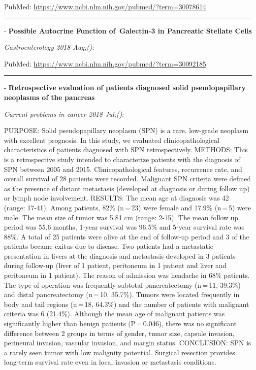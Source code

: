 \documentclass[]{article}
\begin{document}
PubMed: \url{https://www.ncbi.nlm.nih.gov/pubmed/?term=30078614}

{}

{}

\begin{center}\rule{0.5\linewidth}{\linethickness}\end{center}

 - \textbf{Possible Autocrine Function of~Galectin-3 in Pancreatic
Stellate Cells}

\emph{Gastroenterology 2018 Aug;():}

PubMed: \url{https://www.ncbi.nlm.nih.gov/pubmed/?term=30092185}

{}

{}

\begin{center}\rule{0.5\linewidth}{\linethickness}\end{center}

 - \textbf{Retrospective evaluation of patients diagnosed solid
pseudopapillary neoplasms of the pancreas}

\emph{Current problems in cancer 2018 Jul;():}

PURPOSE: Solid pseudopapillary neoplasm (SPN) is a rare, low-grade
neoplasm with excellent prognosis. In this study, we evaluated
clinicopathological characteristics of patients diagnosed with SPN
retrospectively. METHODS: This is a retrospective study intended to
characterize patients with the diagnosis of SPN between 2005 and 2015.
Clinicopathological features, recurrence rate, and overall survival of
28 patients were recorded. Malignant SPN criteria were defined as the
presence of distant metastasis (developed at diagnosis or during follow
up) or lymph node involvement. RESULTS: The mean age at diagnosis was 42
(range: 17-41). Among patients, 82\% (n\,=\,23) were female and 17.9\%
(n\,=\,5) were male. The mean size of tumor was 5.81 cm (range: 2-15).
The mean follow up period was 55.6 months, 1-year survival was 96.5\%
and 5-year survival rate was 88\%. A total of 25 patients were alive at
the end of follow-up period and 3 of the patients became exitus due to
disease. Two patients had a metastatic presentation in livers at the
diagnosis and metastasis developed in 3 patients during follow-up (liver
of 1 patient, peritoneum in 1 patient and liver and peritoneum in 1
patient). The reason of admission was headache in 68\% patients. The
type of operation was frequently subtotal pancreatectomy (n\,=\,11,
39.3\%) and distal pancreatectomy (n\,=\,10, 35.7\%). Tumors were
located frequently in body and tail regions (n\,=\,18, 64.3\%) and the
number of patients with malignant criteria was 6 (21.4\%). Although the
mean age of malignant patients was significantly higher than benign
patients (P\,=\,0.046), there was no significant difference between 2
groups in terms of gender, tumor size, capsule invasion, perineural
invasion, vascular invasion, and margin status. CONCLUSION: SPN is a
rarely seen tumor with low malignity potential. Surgical resection
provides long-term survival rate even in local invasion or metastasis
conditions.
\end{document}

